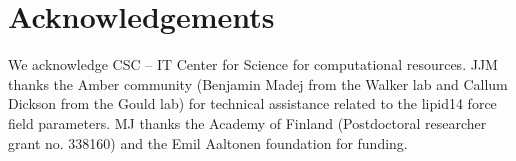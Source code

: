 \documentclass[aps,prl,superscriptaddress]{revtex4-2}
\begin{document}
\section{Acknowledgements}
We acknowledge CSC -- IT Center for Science for computational resources.
%
JJM thanks the Amber community (Benjamin Madej from the Walker lab and Callum Dickson from the Gould lab) for technical assistance related to the lipid14 force field parameters. 
%
MJ thanks the Academy of Finland (Postdoctoral researcher grant no. 338160) and the Emil Aaltonen foundation for funding.




\listoftodos
\end{document}
